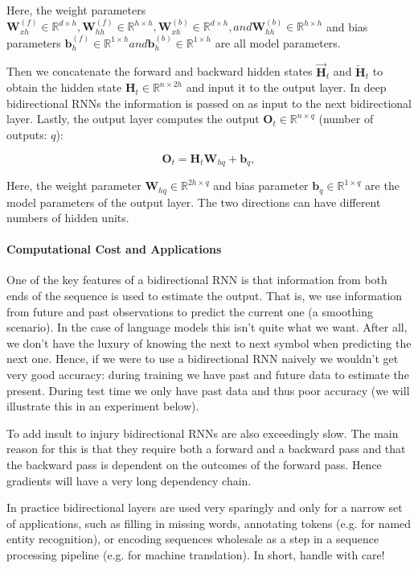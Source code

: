 Here, the weight parameters $\mathbf{W}_{xh}^{(f)} \in \mathbb{R}^{d \times h}, \mathbf{W}_{hh}^{(f)} \in \mathbb{R}^{h \times h}, \mathbf{W}_{xh}^{(b)} \in \mathbb{R}^{d \times h}, and \mathbf{W}_{hh}^{(b)} \in \mathbb{R}^{h \times h}$ and bias parameters $\mathbf{b}_h^{(f)} \in \mathbb{R}^{1 \times h} and \mathbf{b}_h^{(b)} \in \mathbb{R}^{1 \times h}$ are all model parameters.

Then we concatenate the forward and backward hidden states $\overrightarrow{\mathbf{H}}_t$ and $\overleftarrow{\mathbf{H}}_t$ to obtain the hidden state $\mathbf{H}_t \in \mathbb{R}^{n \times 2h}$ and input it to the output layer. In deep bidirectional RNNs the information is passed on as input to the next bidirectional layer. Lastly, the output layer computes the output $\mathbf{O}_t \in \mathbb{R}^{n \times q}$ (number of outputs: $q$):

$$\mathbf{O}_t = \mathbf{H}_t \mathbf{W}_{hq} + \mathbf{b}_q,$$

Here, the weight parameter $\mathbf{W}_{hq} \in \mathbb{R}^{2h \times q}$ and bias parameter $\mathbf{b}_q \in \mathbb{R}^{1 \times q}$ are the model parameters of the output layer. The two directions can have different numbers of hidden units.

\paragraph{Computational Cost and Applications}

One of the key features of a bidirectional RNN is that information from both ends of the sequence is used to estimate the output. That is, we use information from future and past observations to predict the current one (a smoothing scenario). In the case of language models this isn't quite what we want. After all, we don't have the luxury of knowing the next to next symbol when predicting the next one. Hence, if we were to use a bidirectional RNN naively we wouldn't get very good accuracy: during training we have past and future data to estimate the present. During test time we only have past data and thus poor accuracy (we will illustrate this in an experiment below).

To add insult to injury bidirectional RNNs are also exceedingly slow. The main reason for this is that they require both a forward and a backward pass and that the backward pass is dependent on the outcomes of the forward pass. Hence gradients will have a very long dependency chain.

In practice bidirectional layers are used very sparingly and only for a narrow set of applications, such as filling in missing words, annotating tokens (e.g. for named entity recognition), or encoding sequences wholesale as a step in a sequence processing pipeline (e.g. for machine translation). In short, handle with care!
